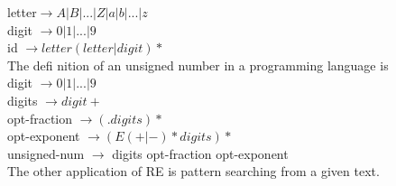\documentclass[8pt]{beamer}
\begin{document}
\begin{frame}
\hspace*{4cm} letter$ \rightarrow A | B | ... | Z | a | b | ... | z$ \\
\hspace*{4cm} digit $ \rightarrow 0 | 1 | ... | 9$ \\
\hspace*{4cm} id $ \rightarrow letter (letter | digit) *$ \\

\vspace*{0.2cm}
The defi nition of an unsigned number in a programming language is\\

\vspace*{0.2cm}
\hspace*{4cm} digit $ \rightarrow 0 | 1 | ... | 9$ \\
\hspace*{4cm} digits $ \rightarrow digit +$ \\
\hspace*{3.5cm} opt-fraction $ \rightarrow (. digits) *$ \\
\hspace*{3cm} opt-exponent $ \rightarrow (E (+ | -) * digits) *$ \\
\hspace*{2cm} unsigned-num $\rightarrow$ digits opt-fraction opt-exponent\\

\vspace*{0.2cm}
The other application of RE is pattern searching from a given text.\\

\vspace*{0.4cm}
\end{frame}
\end{document}
